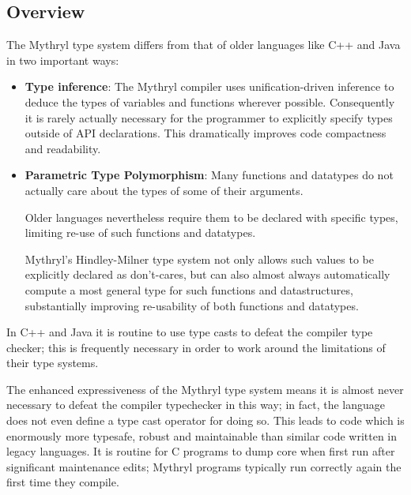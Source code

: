 
\subsection{Overview}
\label{section:ref:types:overview}

The Mythryl type system differs from that of older 
languages like C++ and Java in two important ways: 

\begin{itemize}
\item {\bf Type inference}: The Mythryl compiler uses unification-driven 
      inference to deduce the types of variables and functions wherever 
      possible.  Consequently it is rarely actually necessary for the 
      programmer to explicitly specify types outside of API declarations. 
      This dramatically improves code compactness and readability.

\item {\bf Parametric Type Polymorphism}: Many functions and datatypes 
      do not actually care about the types of some of their arguments.

      Older languages nevertheless require them to be declared with 
      specific types, limiting re-use of such functions and datatypes.

      Mythryl's Hindley-Milner type system not only allows such values 
      to be explicitly declared as don't-cares, but can also almost always 
      automatically compute a most general type for such functions and 
      datastructures, substantially improving re-usability of both 
      functions and datatypes.
\end{itemize}

In C++ and Java it is routine to use type casts to defeat the 
compiler type checker;  this is frequently necessary in order 
to work around the limitations of their type systems.

The enhanced expressiveness of the Mythryl type system means 
it is almost never necessary to defeat the compiler typechecker 
in this way;  in fact, the language does not even define a type 
cast operator for doing so.  This leads to code which is enormously 
more typesafe, robust and maintainable than similar code written 
in legacy languages.  It is routine for C programs to dump core 
when first run after significant maintenance edits;  Mythryl 
programs typically run correctly again the first time they 
compile.


